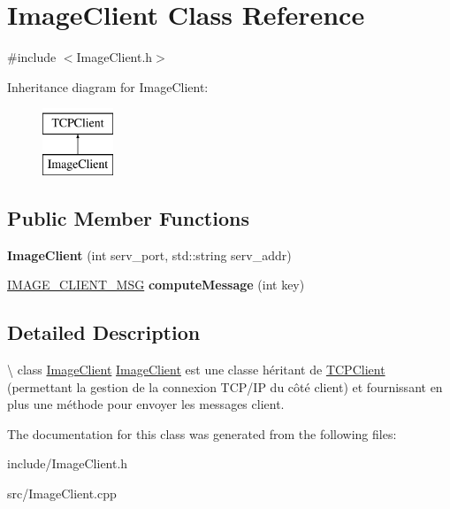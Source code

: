 \hypertarget{classImageClient}{\section{Image\-Client Class Reference}
\label{classImageClient}
}


{\ttfamily \#include $<$Image\-Client.\-h$>$}

Inheritance diagram for Image\-Client\-:\begin{figure}[H]
\begin{center}
\leavevmode
\includegraphics[height=2.000000cm]{classImageClient}
\end{center}
\end{figure}
\subsection*{Public Member Functions}
\begin{DoxyCompactItemize}
\item 
\hypertarget{classImageClient_aad4a7ff2206d2634926008ff8f710ee1}{{\bfseries Image\-Client} (int serv\-\_\-port, std\-::string serv\-\_\-addr)}\label{classImageClient_aad4a7ff2206d2634926008ff8f710ee1}

\item 
\hypertarget{classImageClient_a9d9f83083fda76d517215e810697501d}{\hyperlink{unionIMAGE__CLIENT__MSG}{I\-M\-A\-G\-E\-\_\-\-C\-L\-I\-E\-N\-T\-\_\-\-M\-S\-G} {\bfseries compute\-Message} (int key)}\label{classImageClient_a9d9f83083fda76d517215e810697501d}

\end{DoxyCompactItemize}


\subsection{Detailed Description}
\textbackslash{} class \hyperlink{classImageClient}{Image\-Client} \hyperlink{classImageClient}{Image\-Client} est une classe héritant de \hyperlink{classTCPClient}{T\-C\-P\-Client} (permettant la gestion de la connexion T\-C\-P/\-I\-P du côté client) et fournissant en plus une méthode pour envoyer les messages client. 

The documentation for this class was generated from the following files\-:\begin{DoxyCompactItemize}
\item 
include/Image\-Client.\-h\item 
src/Image\-Client.\-cpp\end{DoxyCompactItemize}
